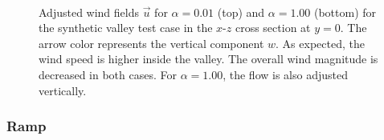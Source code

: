 \documentclass[twocolumn,letterpaper]{IEEEAerospaceCLS}
\begin{document}
\begin{figure}[htbp]
\centering
{}
\\
\caption{Adjusted wind fields $\vec{u}$ for $\alpha = 0.01$ (top) and $\alpha = 1.00$ (bottom) for the synthetic valley test case in the $x$-$z$ cross section at $y = 0$. The arrow color represents the vertical component $w$. As expected, the wind speed is higher inside the valley. The overall wind magnitude is decreased in both cases. For $\alpha = 1.00$, the flow is also adjusted vertically.}
\label{fig:PL_wind_fields_valley}
\end{figure}

\subsubsection{Ramp}
\label{sec:PL_WindPred_ramp}
\end{document}
